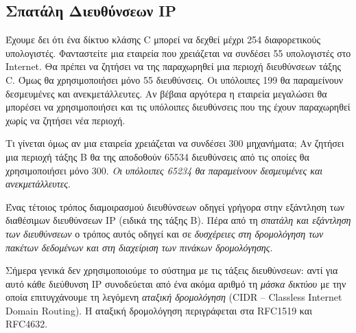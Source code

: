 %
%
\subsection{Σπατάλη Διευθύνσεων IP}

Έχουμε δει ότι ένα δίκτυο κλάσης C μπορεί να δεχθεί μέχρι 254 διαφορετικούς υπολογιστές. Φανταστείτε μια εταιρεία που χρειάζεται να συνδέσει 55 υπολογιστές στο Internet. Θα πρέπει να ζητήσει να της παραχωρηθεί μια περιοχή διευθύνσεων τάξης C. Όμως θα χρησιμοποιήσει μόνο 55 διευθύνσεις. Οι υπόλοιπες 199 θα παραμείνουν δεσμευμένες και ανεκμετάλλευτες. Αν βέβαια αργότερα η εταιρεία μεγαλώσει θα μπορέσει να χρησιμοποιήσει και τις υπόλοιπες διευθύνσεις που της έχουν παραχωρηθεί χωρίς να ζητήσει νέα περιοχή.

Τι γίνεται όμως αν μια εταιρεία χρειάζεται να συνδέσει 300 μηχανήματα; Αν ζητήσει μια περιοχή τάξης Β θα της αποδοθούν 65534 διευθύνσεις από τις οποίες θα χρησιμοποιήσει μόνο 300. \emph{Οι υπόλοιπες 65234 θα παραμείνουν δεσμευμένες και ανεκμετάλλευτες}. 

Ένας τέτοιος τρόπος διαμοιρασμού διευθύνσεων οδηγεί γρήγορα στην εξάντληση των διαθέσιμων διευθύνσεων IP (ειδικά της τάξης Β). Πέρα από τη \emph{σπατάλη και εξάντληση των διευθύνσεων} ο τρόπος αυτός οδηγεί και σε \emph{δυσχέρειες στη δρομολόγηση των πακέτων δεδομένων και στη διαχείριση των πινάκων δρομολόγησης}.

Σήμερα γενικά δεν χρησιμοποιούμε το σύστημα με τις τάξεις διευθύνσεων: αντί για αυτό κάθε διεύθυνση IP συνοδεύεται από ένα ακόμα αριθμό τη \emph{μάσκα δικτύου} με την οποία επιτυγχάνουμε τη λεγόμενη \emph{αταξική δρομολόγηση} (CIDR -- Classless Internet Domain Routing). Η αταξική δρομολόγηση περιγράφεται στα RFC1519 και RFC4632.